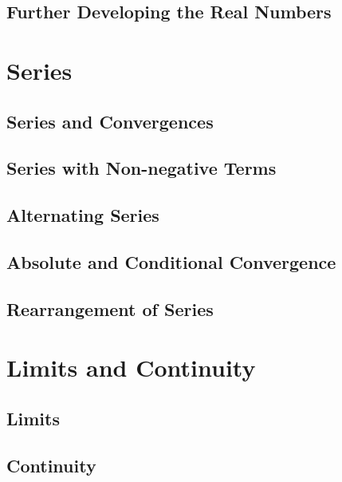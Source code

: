 \documentclass[a4paper]{article}
\begin{document}
\subsection{Further Developing the Real Numbers}

\pagebreak

\section{Series}
\subsection{Series and Convergences}
\subsection{Series with Non-negative Terms}
\subsection{Alternating Series}
\subsection{Absolute and Conditional Convergence}
\subsection{Rearrangement of Series}

\pagebreak

\section{Limits and Continuity}
\subsection{Limits}
\subsection{Continuity}
\end{document}
